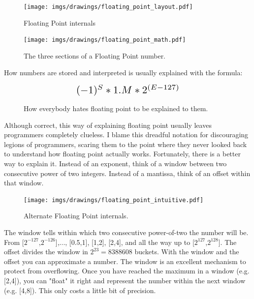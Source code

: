 \documentclass[book.tex]{subfiles}
\begin{document}
\begin{figure}[H]
\centering
\texttt{[image: imgs/drawings/floating\_point\_layout.pdf]}
\caption{Floating Point internals}
\end{figure}
  \bigskip



\begin{figure}[H]
\centering
\texttt{[image: imgs/drawings/floating\_point\_math.pdf]}
\caption{The three sections of a Floating Point number.}
\end{figure}
  \bigskip  


How numbers are stored and interpreted is usually explained with the formula:\\
\par
\begin{figure}[H]
\begin{equation*}\label{eq:fp}
\scalebox{1.5}{
$(-1)^S * 1.M * 2^{(E-127)}$
}
\end{equation*}
 \caption{How everybody hates floating point to be explained to them.}
\end{figure}
\bigskip  

Although correct, this way of explaining floating point usually leaves programmers completely clueless. I blame this dreadful notation for discouraging legions of programmers, scaring them to the point where they never looked back to understand how floating point actually works. Fortunately, there is a better way to explain it. Instead of an exponent, think of a window between two consecutive power of two integers. Instead of a mantissa, think of an offset within that window.\\ 
\par
  
\begin{figure}[H]
\centering
\texttt{[image: imgs/drawings/floating\_point\_intuitive.pdf]}
\caption{Alternate Floating Point internals.}
\end{figure}
  \bigskip  
The window tells within which two consecutive power-of-two the number will be. From [$2^{-127}$,$2^{-126}$],..., [0.5,1], [1,2], [2,4], and all the way up to [$2^{127}$,$2^{128}$]. The offset divides the window in $ 2^{23} = 8388608 $  buckets. With the window and the offset you can approximate a number. The window is an excellent mechanism to protect from overflowing. Once you have reached the maximum in a window (e.g. [2,4]), you can "float" it right and represent the number within the next window (e.g. [4,8]). This only costs a little bit of precision.\\
\end{document}
